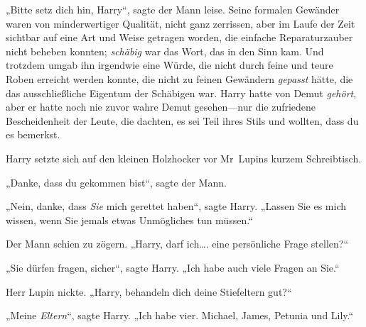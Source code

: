 „Bitte setz dich hin, Harry“, sagte der Mann leise. Seine formalen Gewänder waren von minderwertiger Qualität, nicht ganz zerrissen, aber im Laufe der Zeit sichtbar auf eine Art und Weise getragen worden, die einfache Reparaturzauber nicht beheben konnten; \emph{schäbig} war das Wort, das in den Sinn kam. Und trotzdem umgab ihn irgendwie eine Würde, die nicht durch feine und teure Roben erreicht werden konnte, die nicht zu feinen Gewändern \emph{gepasst} hätte, die das ausschließliche Eigentum der Schäbigen war. Harry hatte von Demut \emph{gehört}, aber er hatte noch nie zuvor wahre Demut gesehen—nur die zufriedene Bescheidenheit der Leute, die dachten, es sei Teil ihres Stils und wollten, dass du es bemerkst.

Harry setzte sich auf den kleinen Holzhocker vor Mr~Lupins kurzem Schreibtisch.

„Danke, dass du gekommen bist“, sagte der Mann.

„Nein, danke, dass \emph{Sie} mich gerettet haben“, sagte Harry. „Lassen Sie es mich wissen, wenn Sie jemals etwas Unmögliches tun müssen.“

Der Mann schien zu zögern. „Harry, darf ich…. eine persönliche Frage stellen?“

„Sie dürfen fragen, sicher“, sagte Harry. „Ich habe auch viele Fragen an Sie.“

Herr Lupin nickte. „Harry, behandeln dich deine Stiefeltern gut?“

„Meine \emph{Eltern}“, sagte Harry. „Ich habe vier. Michael, James, Petunia und Lily.“

